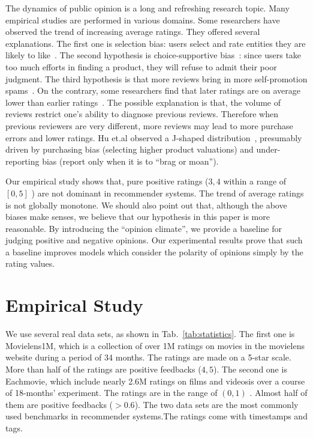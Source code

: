 \documentclass[sigconf]{acmart}
\begin{document}
The dynamics of public opinion is a long and refreshing research topic. Many empirical studies are performed in various domains. Some researchers have observed the trend of increasing average ratings. They offered several explanations. The first one is selection bias: users select and rate entities they are likely to like~\cite{Dalvi2013Para}. The second hypothesis is choice-supportive bias~\cite{Cohen1970dissonance}: since users take too much efforts in finding a product, they will refuse to admit their poor judgment. The third hypothesis is that more reviews bring in more self-promotion spams~\cite{Jindal2008Opinion}. On the contrary, some researchers find that later ratings are on average lower than earlier ratings~\cite{Godes2012Sequential}. The possible explanation is that, the volume of reviews restrict one's ability to diagnose previous reviews. Therefore when previous reviewers are very different, more reviews may  lead to more purchase errors and lower ratings. Hu et.al observed a J-shaped distribution~\cite{Hu2009Overcoming}, presumably driven by purchasing bias (selecting higher product valuations) and under-reporting bias (report only when it is to ``brag or moan'').

Our empirical study shows that, pure positive ratings ($3,4$ within a range of $[0,5]$ ) are not dominant in recommender systems. The trend of average ratings is not globally monotone. We should also point out that, although the above biases make senses, we believe that our hypothesis in this paper is more reasonable. By introducing the ``opinion climate'', we provide a baseline for judging positive and negative opinions. Our experimental results prove that such a baseline  improves models which consider the polarity of opinions simply by the rating values.



\section{Empirical Study}\label{sec:empirical}
We use several real data sets, as shown in Tab.~\ref{tab:statistics}. The first one is Movielens1M, which is a collection of over 1M ratings on movies in the movielens website during a period of 34 months. The ratings are made on a 5-star scale. More than half of the ratings are positive feedbacks ($4,5$).  The second one is Eachmovie, which include nearly 2.6M ratings on films and videosis over a course of 18-months' experiment. The  ratings are in the range of $(0,1)$ . Almost half of them are positive feedbacks ($>0.6$). The two data sets are the most commonly used benchmarks in recommender systems.The ratings come with timestamps and tags.
\end{document}
